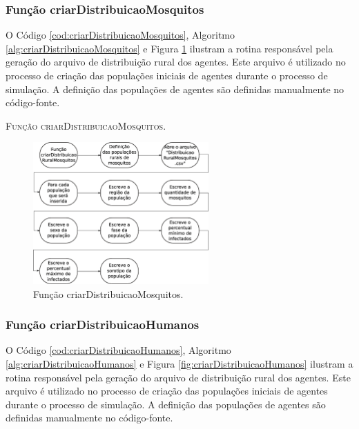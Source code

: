 \subsubsection{Função criarDistribuicaoMosquitos}

O Código \ref{cod:criarDistribuicaoMosquitos}, Algoritmo \ref{alg:criarDistribuicaoMosquitos} e Figura \ref{fig:criarDistribuicaoMosquitos} ilustram a rotina responsável pela geração do arquivo de distribuição rural dos agentes. Este arquivo é utilizado no processo de criação das populações iniciais de agentes durante o processo de simulação. A definição das populações de agentes são definidas manualmente no código-fonte. 



\begin{algorithm}[H]
   \SetAlgoLined   
   
   \caption{\textsc{Função criarDistribuicaoMosquitos.}}
   \label{alg:criarDistribuicaoMosquitos}
\end{algorithm}

\begin{figure}[H]
  \centering
  \includegraphics[width=0.6\textwidth]{Figuras/Simula/Fluxos/criarDistribuicaoMosquitos.eps}
  \caption{Função criarDistribuicaoMosquitos.}
  \label{fig:criarDistribuicaoMosquitos}
\end{figure} 

\newpage

\subsubsection{Função criarDistribuicaoHumanos}

O Código \ref{cod:criarDistribuicaoHumanos}, Algoritmo \ref{alg:criarDistribuicaoHumanos} e Figura \ref{fig:criarDistribuicaoHumanos} ilustram a rotina responsável pela geração do arquivo de distribuição rural dos agentes. Este arquivo é utilizado no processo de criação das populações iniciais de agentes durante o processo de simulação. A definição das populações de agentes são definidas manualmente no código-fonte. 

